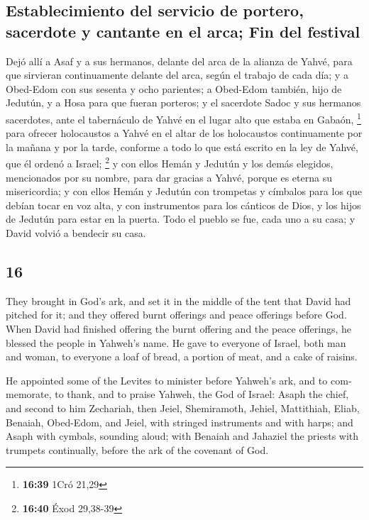 \begin{paracol}{2}
\hypertarget{establecimiento-del-servicio-de-portero-sacerdote-y-cantante-en-el-arca-fin-del-festival}{%
\subsection{Establecimiento del servicio de portero, sacerdote y
cantante en el arca; Fin del
festival}\label{establecimiento-del-servicio-de-portero-sacerdote-y-cantante-en-el-arca-fin-del-festival}}

 Dejó allí a Asaf y a sus hermanos, delante del arca de
la alianza de Yahvé, para que sirvieran continuamente delante del arca,
según el trabajo de cada día;  y a Obed-Edom con sus
sesenta y ocho parientes; a Obed-Edom también, hijo de Jedutún, y a Hosa
para que fueran porteros;  y el sacerdote Sadoc y sus
hermanos sacerdotes, ante el tabernáculo de Yahvé en el lugar alto que
estaba en Gabaón, \footnote{\textbf{16:39} 1Cró 21,29} 
para ofrecer holocaustos a Yahvé en el altar de los holocaustos
continuamente por la mañana y por la tarde, conforme a todo lo que está
escrito en la ley de Yahvé, que él ordenó a Israel; \footnote{\textbf{16:40}
  Éxod 29,38-39}  y con ellos Hemán y Jedutún y los demás
elegidos, mencionados por su nombre, para dar gracias a Yahvé, porque es
eterna su misericordia;  y con ellos Hemán y Jedutún con
trompetas y címbalos para los que debían tocar en voz alta, y con
instrumentos para los cánticos de Dios, y los hijos de Jedutún para
estar en la puerta.  Todo el pueblo se fue, cada uno a su
casa; y David volvió a bendecir su casa.

\switchcolumn
\begin{otherlanguage}{english}

\hypertarget{section-31}{%
\section{16}\label{section-31}}

 They brought in God's ark, and set it in the middle of
the tent that David had pitched for it; and they offered burnt offerings
and peace offerings before God.  When David had finished
offering the burnt offering and the peace offerings, he blessed the
people in Yahweh's name.  He gave to everyone of Israel,
both man and woman, to everyone a loaf of bread, a portion of meat, and
a cake of raisins.

 He appointed some of the Levites to minister before
Yahweh's ark, and to commemorate, to thank, and to praise Yahweh, the
God of Israel:  Asaph the chief, and second to him
Zechariah, then Jeiel, Shemiramoth, Jehiel, Mattithiah, Eliab, Benaiah,
Obed-Edom, and Jeiel, with stringed instruments and with harps; and
Asaph with cymbals, sounding aloud;  with Benaiah and
Jahaziel the priests with trumpets continually, before the ark of the
covenant of God.


\end{otherlanguage}
\end{paracol}

